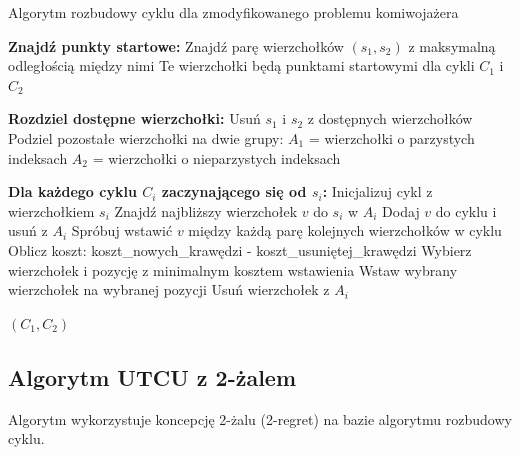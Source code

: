 \documentclass[12pt,a4paper]{article}
\begin{document}
\begin{algorithm}
\caption{Algorytm rozbudowy cyklu dla zmodyfikowanego problemu komiwojażera}
\begin{algorithmic}[1]
\State \textbf{Znajdź punkty startowe:}
\State Znajdź parę wierzchołków $(s_1, s_2)$ z maksymalną odległością między nimi
\State Te wierzchołki będą punktami startowymi dla cykli $C_1$ i $C_2$

\State \textbf{Rozdziel dostępne wierzchołki:}
\State Usuń $s_1$ i $s_2$ z dostępnych wierzchołków
\State Podziel pozostałe wierzchołki na dwie grupy:
\State $A_1$ = wierzchołki o parzystych indeksach
\State $A_2$ = wierzchołki o nieparzystych indeksach

\State \textbf{Dla każdego cyklu $C_i$ zaczynającego się od $s_i$:}
\State Inicjalizuj cykl z wierzchołkiem $s_i$
\State Znajdź najbliższy wierzchołek $v$ do $s_i$ w $A_i$
\State Dodaj $v$ do cyklu i usuń z $A_i$
        \State Spróbuj wstawić $v$ między każdą parę kolejnych wierzchołków w cyklu
        \State Oblicz koszt: koszt\_nowych\_krawędzi - koszt\_usuniętej\_krawędzi
    \EndFor
    \State Wybierz wierzchołek i pozycję z minimalnym kosztem wstawienia
    \State Wstaw wybrany wierzchołek na wybranej pozycji
    \State Usuń wierzchołek z $A_i$
\EndWhile

\State \Return $(C_1, C_2)$
\end{algorithmic}
\end{algorithm}

\subsection{Algorytm UTCU z 2-żalem}
Algorytm wykorzystuje koncepcję 2-żalu (2-regret) na bazie algorytmu rozbudowy cyklu.
\end{document}
